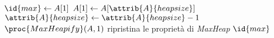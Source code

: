 \begin{codebox}
\li $\id{max} \gets A[1]$
\li $A[1] \gets A[\attrib{A}{heapsize}]$
\li $\attrib{A}{heapsize} \gets \attrib{A}{heapsize} - 1$
\li $\proc{MaxHeapify}(A,1)$
        \Comment ripristina le proprietà di \emph{MaxHeap}
\li \Return $\id{max}$
\end{codebox}